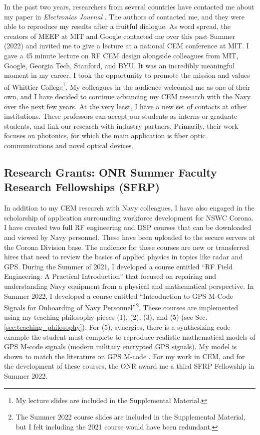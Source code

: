 \documentclass[../../../main.tex]{subfiles}
\begin{document}
In the past two years, researchers from several countries have contacted me about my paper in \textit{Electronics Journal}  \cite{electronics10040415}.  The authors of \cite{10.3390/electronics8121506} contacted me, and they were able to reproduce my results after a fruitful dialogue.  As word spread, the creators of MEEP at MIT and Google contacted me over this past Summer (2022) and invited me to give a lecture at a national CEM conference at MIT.  I gave a 45 minute lecture on RF CEM design alongside colleagues from MIT, Google, Georgia Tech, Stanford, and BYU.  It was an incredibly meaningful moment in my career.  I took the opportunity to promote the mission and values of Whittier College\footnote{My lecture slides are included in the Supplemental Material.}.  My colleagues in the audience welcomed me as one of their own, and I have decided to continue advancing my CEM research with the Navy over the next few years.  At the very least, I have a new set of contacts at other institutions.  These professors can accept our students as interns or graduate students, and link our research with industry partners.  Primarily, their work focuses on photonics, for which the main application is fiber optic communications and novel optical devices.

\subsection{Research Grants: ONR Summer Faculty Research Fellowships (SFRP)}
\label{sec:fellow}

In addition to my CEM research with Navy colleagues, I have also engaged in the scholarship of application surrounding workforce development for NSWC Corona.  I have created two full RF engineering and DSP courses that can be downloaded and viewed by Navy personnel.  These have been uploaded to the secure servers at the Corona Division base.  The audience for these courses are new or transferred hires that need to review the basics of applied physics in topics like radar and GPS.  During the Summer of 2021, I developed a course entitled ``RF Field Engineering: A Practical Introduction'' that focused on repairing and understanding Navy equipment from a physical and mathematical perspective.  In Summer 2022, I developed a course entitled ``Introduction to GPS M-Code Signals for Onboarding of Navy Personnel''\footnote{The Summer 2022 course slides are included in the Supplemental Material, but I felt including the 2021 course would have been redundant.}.  These courses are implemented using my teaching philosophy pieces (1), (2), (3), and (5) (see Sec. \ref{sec:teaching_philosophy}).  For (5), synergies, there is a synthesizing code example the student must complete to reproduce realistic mathematical models of GPS M-code signals (modern military encrypted GPS signals).  My model is shown to match the literature on GPS M-code \cite{mcode}.  For my work in CEM, and for the development of these courses, the ONR award me a third SFRP Fellowship in Summer 2022.
\end{document}
